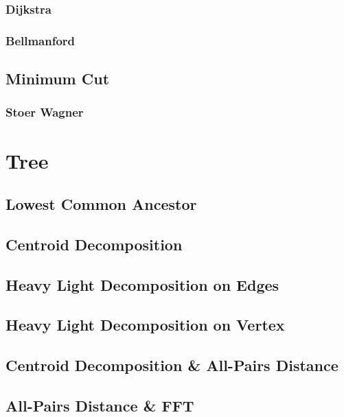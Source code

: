 \documentclass[10pt,a4paper]{report}
\begin{document}
			\subsubsection{Dijkstra}
				
			\newpage
			\subsubsection{Bellmanford}
		\subsection{Minimum Cut}
			\subsubsection{Stoer Wagner}
				
	
	\newpage
	\section{Tree}
		\subsection{Lowest Common Ancestor}
			
		\newpage
		\subsection{Centroid Decomposition}
			
		\newpage
		\subsection{Heavy Light Decomposition on Edges}
			
		\subsection{Heavy Light Decomposition on Vertex}
		\newpage
		\subsection{Centroid Decomposition \& All-Pairs Distance}
			
		\subsection{All-Pairs Distance \& FFT}
\end{document}
